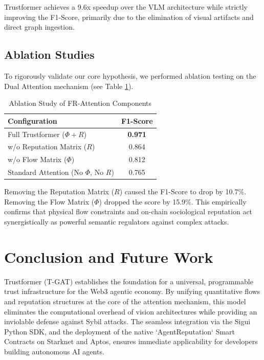 \documentclass[conference,10pt]{IEEEtran}
\begin{document}
Trustformer achieves a 9.6x speedup over the VLM architecture while strictly improving the F1-Score, primarily due to the elimination of visual artifacts and direct graph ingestion.

\subsection{Ablation Studies}
To rigorously validate our core hypothesis, we performed ablation testing on the Dual Attention mechanism (see Table \ref{tab:ablation}). 

\begin{table}[htbp]
\caption{Ablation Study of FR-Attention Components}
\begin{center}
\begin{tabular}{l c}
\toprule
\textbf{Configuration} & \textbf{F1-Score} \\
\midrule
Full Trustformer ($\Phi + R$) & \textbf{0.971} \\
w/o Reputation Matrix ($R$) & 0.864 \\
w/o Flow Matrix ($\Phi$) & 0.812 \\
Standard Attention (No $\Phi$, No $R$) & 0.765 \\
\bottomrule
\end{tabular}
\label{tab:ablation}
\end{center}
\end{table}

Removing the Reputation Matrix ($R$) caused the F1-Score to drop by 10.7\%. Removing the Flow Matrix ($\Phi$) dropped the score by 15.9\%. This empirically confirms that physical flow constraints and on-chain sociological reputation act synergistically as powerful semantic regulators against complex attacks.

\section{Conclusion and Future Work}
Trustformer (T-GAT) establishes the foundation for a universal, programmable trust infrastructure for the Web3 agentic economy. By unifying quantitative flows and reputation structures at the core of the attention mechanism, this model eliminates the computational overhead of vision architectures while providing an inviolable defense against Sybil attacks. The seamless integration via the Sigui Python SDK, and the deployment of the native `AgentReputation` Smart Contracts on Starknet and Aptos, ensures immediate applicability for developers building autonomous AI agents.
\end{document}
